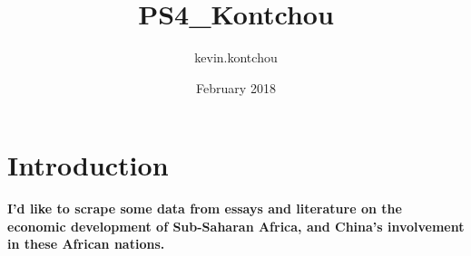 \documentclass{article}
\title{PS4_Kontchou}
\author{kevin.kontchou }
\date{February 2018}
\begin{document}
\maketitle

\section{Introduction}
\textbf{I'd like to scrape some data from essays and literature on the economic development of Sub-Saharan Africa, and China's involvement in these African nations.}
\end{document}
